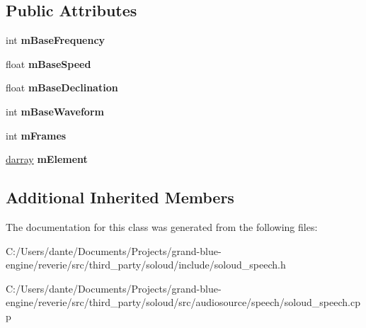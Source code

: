 \subsection*{Public Attributes}
\begin{DoxyCompactItemize}
\item 
\mbox{\label{class_so_loud_1_1_speech_afe79c36a74938c36f24ceb8bed8afe7f}} 
int {\bfseries m\+Base\+Frequency}
\item 
\mbox{\label{class_so_loud_1_1_speech_ac492b53209671504084704ca651d0434}} 
float {\bfseries m\+Base\+Speed}
\item 
\mbox{\label{class_so_loud_1_1_speech_a3ca9f763b8dc8f8ee5fdc35808070aef}} 
float {\bfseries m\+Base\+Declination}
\item 
\mbox{\label{class_so_loud_1_1_speech_ade8b3f4a51ac48b2c01a1c7d4a9f9ed9}} 
int {\bfseries m\+Base\+Waveform}
\item 
\mbox{\label{class_so_loud_1_1_speech_ad62f0bffce5369f20004302215f3e80f}} 
int {\bfseries m\+Frames}
\item 
\mbox{\label{class_so_loud_1_1_speech_a72021ae8bba4e2a66fa096de0bb0d0f8}} 
\mbox{\hyperlink{classdarray}{darray}} {\bfseries m\+Element}
\end{DoxyCompactItemize}
\subsection*{Additional Inherited Members}


The documentation for this class was generated from the following files\+:\begin{DoxyCompactItemize}
\item 
C\+:/\+Users/dante/\+Documents/\+Projects/grand-\/blue-\/engine/reverie/src/third\+\_\+party/soloud/include/soloud\+\_\+speech.\+h\item 
C\+:/\+Users/dante/\+Documents/\+Projects/grand-\/blue-\/engine/reverie/src/third\+\_\+party/soloud/src/audiosource/speech/soloud\+\_\+speech.\+cpp\end{DoxyCompactItemize}
